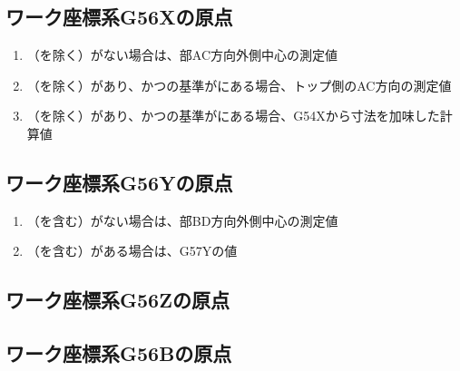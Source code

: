 \subsection{ワーク座標系{\ttfamily G56X}の原点}
\begin{enumerate}[label*=\sarrow]
\item \TopOutcut（\TopCurvedOutcut を除く）がない場合は、\TopEndFace 部AC方向外側中心の測定値
\item \TopOutcut（\TopCurvedOutcut を除く）があり、かつ\OutcutCenter の基準が\TopOutcut にある場合、トップ側のAC方向\OutcutCenter の測定値
\item \TopOutcut（\TopCurvedOutcut を除く）があり、かつ\OutcutCenter の基準が\BottomOutcut にある場合、{\ttfamily G54X}から\CenterlineEndFaceDif 寸法を加味した計算値
\end{enumerate}


\subsection{ワーク座標系{\ttfamily G56Y}の原点}
\begin{enumerate}[label*=\sarrow]
\item \TopOutcut（\TopCurvedOutcut を含む）がない場合は、\TopEndFace 部BD方向外側中心の測定値
\item \TopOutcut（\TopCurvedOutcut を含む）がある場合は、{\ttfamily G57Y}の値
\end{enumerate}


\subsection{ワーク座標系{\ttfamily G56Z}の原点\TBW}


\subsection{ワーク座標系{\ttfamily G56B}の原点\TBW}


